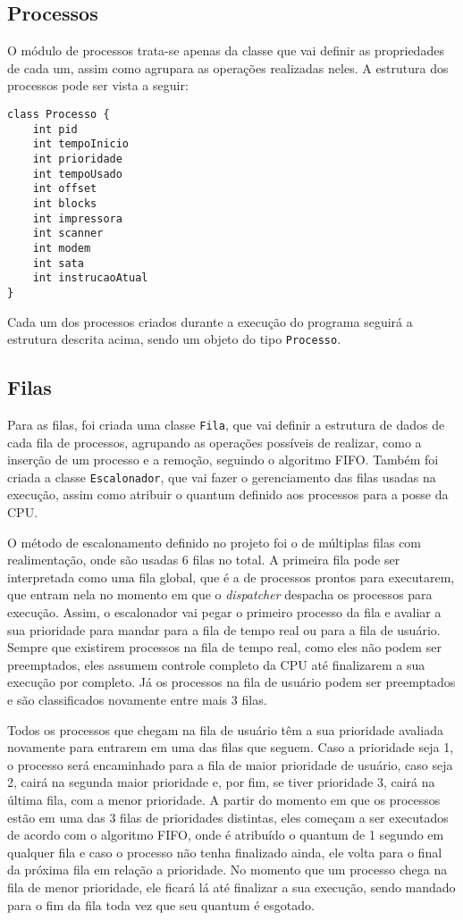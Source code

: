 \documentclass[12pt]{article}
\begin{document}
\subsection{Processos}
O módulo de processos trata-se apenas da classe que vai definir as propriedades de cada um, assim como agrupara as operações realizadas neles. A estrutura dos processos pode ser vista a seguir:

\begin{verbatim}
class Processo {
    int pid
    int tempoInicio
    int prioridade
    int tempoUsado
    int offset
    int blocks
    int impressora
    int scanner
    int modem
    int sata
    int instrucaoAtual
}
\end{verbatim}

Cada um dos processos criados durante a execução do programa seguirá a estrutura descrita acima, sendo um objeto do tipo \texttt{Processo}.

\subsection{Filas}
Para as filas, foi criada uma classe \texttt{Fila}, que vai definir a estrutura de dados de cada fila de processos, agrupando as operações possíveis de realizar, como a inserção de um processo e a remoção, seguindo o algoritmo FIFO. Também foi criada a classe \texttt{Escalonador}, que vai fazer o gerenciamento das filas usadas na execução, assim como atribuir o quantum definido aos processos para a posse da CPU.

O método de escalonamento definido no projeto foi o de múltiplas filas com realimentação, onde são usadas 6 filas no total. A primeira fila pode ser interpretada como uma fila global, que é a de processos prontos para executarem, que entram nela no momento em que o \textit{dispatcher} despacha os processos para execução. Assim, o escalonador vai pegar o primeiro processo da fila e avaliar a sua prioridade para mandar para a fila de tempo real ou para a fila de usuário. Sempre que existirem processos na fila de tempo real, como eles não podem ser preemptados, eles assumem controle completo da CPU até finalizarem a sua execução por completo. Já os processos na fila de usuário podem ser preemptados e são classificados novamente entre mais 3 filas.

Todos os processos que chegam na fila de usuário têm a sua prioridade avaliada novamente para entrarem em uma das filas que seguem. Caso a prioridade seja 1, o processo será encaminhado para a fila de maior prioridade de usuário, caso seja 2, cairá na segunda maior prioridade e, por fim, se tiver prioridade 3, cairá na última fila, com a menor prioridade. A partir do momento em que os processos estão em uma das 3 filas de prioridades distintas, eles começam a ser executados de acordo com o algoritmo FIFO, onde é atribuído o quantum de 1 segundo em qualquer fila e caso o processo não tenha finalizado ainda, ele volta para o final da próxima fila em relação a prioridade. No momento que um processo chega na fila de menor prioridade, ele ficará lá até finalizar a sua execução, sendo mandado para o fim da fila toda vez que seu quantum é esgotado.
\end{document}
